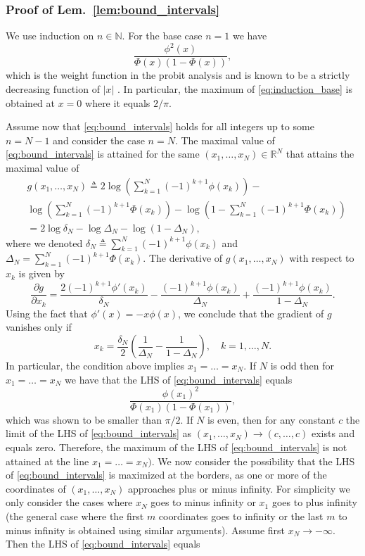 \documentclass[letterpaper, conference]{IEEEtran}      %
\begin{document}
\subsubsection*{Proof of Lem.~\ref{lem:bound_intervals}}
We use induction on $n \in \mathbb N$. For the base case $n=1$ we have 
\begin{equation} \label{eq:induction_base}
\frac{  \phi^2(x)} 
{\Phi(x) \left(1 - \Phi(x) \right) },
\end{equation}
which is the weight function in the probit analysis and is known to be a strictly decreasing function of $|x|$ \cite{Samford1953}. In particular, the maximum of \eqref{eq:induction_base} is obtained at $x=0$ where it equals $2/\pi$. \par
Assume now that \eqref{eq:bound_intervals} holds for all integers up to some $n = N-1$ and consider the case $n = N$. The maximal value of \eqref{eq:bound_intervals} is attained for the same $(x_1,\ldots,x_N) \in \mathbb R^N$ that attains the maximal value of 
\begin{align*}
& g(x_1,\ldots, x_N) \triangleq 2 \log \left(  \sum_{k=1}^{N} (-1)^{k+1} \phi(x_k) \right) - \\
&  \log
\left( \sum_{k=1}^N (-1)^{k+1} \Phi(x_k) \right)
-\log \left(1 -  \sum_{k=1}^N (-1)^{k+1} \Phi(x_k) \right) \\
& = 2 \log \delta_N - \log \Delta_N - \log \left(1 - \Delta_N  \right),
\end{align*}
where we denoted $\delta_N \triangleq \sum_{k=1}^{N} (-1)^{k+1} \phi(x_k)$ and $\Delta_N =  \sum_{k=1}^N (-1)^{k+1} \Phi(x_k)$. The derivative of $g(x_1,\ldots,x_N)$ with respect to $x_k$ is given by
\[
\frac{\partial  g}{\partial x_k} = \frac{2 (-1)^{k+1} \phi'(x_k)}{\delta_N} -\frac{(-1)^{k+1} \phi(x_k)}{\Delta_N } + \frac{(-1)^{k+1} \phi(x_k)}{1-\Delta_N }.
\]
Using the fact that $\phi'(x) = -x \phi(x)$, we conclude that the gradient of $g$ vanishes only if
\[
x_k = \frac{\delta_N}{2} \left( \frac{1}{\Delta_N} - \frac{1}{1-\Delta_N} \right),\quad k=1,\ldots,N.
\]
In particular, the condition above implies $x_1 = \ldots = x_N$. If $N$ is odd then for $x_1=\ldots =x_N$ we have that the LHS of \eqref{eq:bound_intervals} equals
\[
\frac{\phi(x_1)^2}{ \Phi(x_1) (1 - \Phi(x_1))},
\]
which was shown to be smaller than $\pi/2$. If $N$ is even, then for any constant $c$ the limit of the LHS of \eqref{eq:bound_intervals} as $(x_1,\ldots,x_N)\rightarrow (c,\ldots,c)$ exists and equals zero. Therefore, the maximum of the LHS of \eqref{eq:bound_intervals} is not attained at the line $x_1=\ldots=x_N)$. We now consider the possibility that the LHS of \eqref{eq:bound_intervals} is maximized at the borders, as one or more of the coordinates of $(x_1,\ldots,x_N)$ approaches plus or minus infinity. For simplicity we only consider the cases where $x_N$ goes to minus infinity or $x_1$ goes to plus infinity (the general case where the first $m$ coordinates goes to infinity or the last $m$ to minus infinity is obtained using similar arguments). Assume first $x_N \rightarrow -\infty$. Then the LHS of \eqref{eq:bound_intervals} equals
\end{document}

